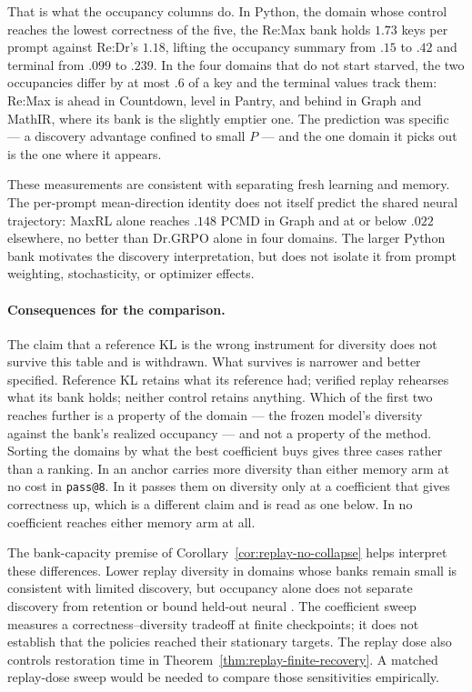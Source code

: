 That is what the occupancy columns do. In Python, the domain whose control
reaches the lowest correctness of the five, the Re:Max bank holds $1.73$ keys
per prompt against Re:Dr's $1.18$, lifting the occupancy summary from $.15$ to
$.42$ and terminal \pmd{} from $.099$ to $.239$. In the four domains that do
not start starved, the two occupancies differ by at most $.6$ of a key and the
terminal values track them: Re:Max is ahead in Countdown, level in Pantry, and
behind in Graph and MathIR, where its bank is the slightly emptier one. The
prediction was specific --- a discovery advantage confined to small $P$ --- and
the one domain it picks out is the one where it appears.

These measurements are consistent with separating fresh learning and
memory. The per-prompt mean-direction identity does not itself predict the
shared neural trajectory: MaxRL alone reaches $.148$ PCMD in Graph and at
or below $.022$ elsewhere, no better than Dr.GRPO alone in four domains.
The larger Python bank motivates the discovery interpretation, but does not
isolate it from prompt weighting, stochasticity, or optimizer effects.

\paragraph{Consequences for the comparison.}
The claim that a reference KL is the wrong instrument for diversity does not
survive this table and is withdrawn. What survives is narrower and better
specified. Reference KL retains what its reference had; verified replay
rehearses what its bank holds; neither control retains anything. Which of the
first two reaches further is a property of the domain --- the frozen model's
diversity against the bank's realized occupancy --- and not a property of the
method. Sorting the domains by what the best coefficient buys gives three
cases rather than a ranking. In \MDklFreeNames{} an anchor carries more diversity than
either memory arm at no cost in \texttt{pass@8}. In \MDklPricedNames{} it
passes them on diversity only at a coefficient that gives correctness up, which
is a different claim and is read as one below. In \MDklMemoryNames{} no
coefficient reaches either memory arm at all.

The bank-capacity premise of Corollary~\ref{cor:replay-no-collapse}
helps interpret these differences. Lower replay diversity in domains whose
banks remain small is consistent with limited discovery, but occupancy alone
does not separate discovery from retention or bound held-out neural
\pmd{}. The coefficient sweep measures a correctness--diversity tradeoff
at finite checkpoints; it does not establish that the policies reached
their stationary targets. The replay dose also controls restoration time
in Theorem~\ref{thm:replay-finite-recovery}. A matched replay-dose sweep
would be needed to compare those sensitivities empirically.

